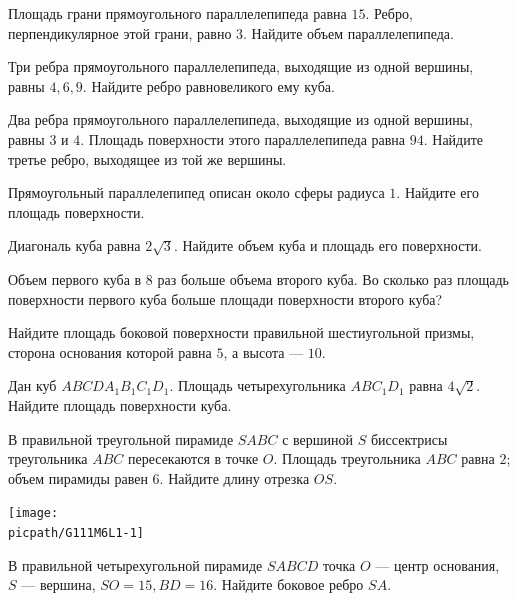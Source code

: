 %
%

\begin{class}[number=1]
	\begin{listofex}
		\item Площадь грани прямоугольного параллелепипеда равна \( 15 \). Ребро, перпендикулярное этой грани, равно \(3\). Найдите объем параллелепипеда.
		\item Три ребра прямоугольного параллелепипеда, выходящие из одной вершины, равны \(4, 6, 9\). Найдите ребро равновеликого ему куба.
		\item Два ребра прямоугольного параллелепипеда, выходящие из одной вершины, равны \(3\) и \(4\). Площадь поверхности этого параллелепипеда равна \(94\). Найдите третье ребро, выходящее из той же вершины.
		\item Прямоугольный параллелепипед описан около сферы радиуса \(1\). Найдите его площадь поверхности.
		\item Диагональ куба равна \( 2\sqrt{3} \). Найдите объем куба и площадь его поверхности.
		\item Объем первого куба в \( 8 \) раз больше объема второго куба. Во сколько раз площадь поверхности первого куба больше площади поверхности второго куба?
		\item Найдите площадь боковой поверхности правильной шестиугольной призмы, сторона основания которой равна \( 5 \), а высота  --- \( 10 \).
		\item Дан куб \( ABCDA_1B_1C_1D_1 \). Площадь четырехугольника \( ABC_1D_1 \) равна \( 4\sqrt{2} \). Найдите площадь поверхности куба.
		\item 
		\begin{minipage}[t]{\bodywidth}
			В правильной треугольной пирамиде \(SABC\) с вершиной \(S\) биссектрисы треугольника \(ABC\) пересекаются в точке \(O\). Площадь треугольника \(ABC\) равна \(2\); объем пирамиды равен \(6\). Найдите длину отрезка \(OS\).
		\end{minipage}
		\hspace{0.02\linewidth}
		\begin{minipage}[t]{\picwidth}
			\texttt{[image: \\picpath/G111M6L1-1]}
		\end{minipage}
		\item В правильной четырехугольной пирамиде \(SABCD\) точка \(O\) --- центр основания, \(S\) --- вершина, \(SO=15, BD=16\). Найдите боковое ребро \(SA\).

\end{listofex}
\end{class}
